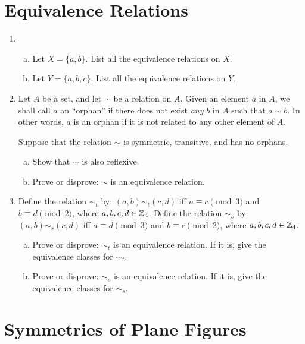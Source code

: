 \section{Equivalence Relations}

\begin{enumerate}

\item
\begin{enumerate}[(a)]
\item
Let $X =\{a, b\}$. List all the equivalence relations on $X$.
\item
Let $Y =\{a, b,c\}$. List all the equivalence relations on $Y$.
\end{enumerate}

\item
Let $A$ be a set, and let $\sim$ be a relation on $A$. Given an element $a$ in  $A$, we shall call $a$ an ``orphan'' if there does not exist \emph{any} $b$ in $A$ such that $a \sim b$. In other words, $a$ is an orphan if it is not related to any other element of $A$.  

Suppose that the relation $\sim$ is symmetric, transitive, and has no orphans.  
\begin{enumerate}[(a)]
\item
Show that $\sim$ is also reflexive.
\item
Prove or disprove:  $\sim$ is an equivalence relation.
\end{enumerate}

\item
Define the relation $\sim_t$ by:  $(a,b) \sim_t  (c,d)$  iff $a \equiv c \pmod{3}$ and $b \equiv d \pmod{2}$, where $a,b,c,d  \in \mathbb{Z}_4$.  Define the relation $\sim_s$  by:  $(a,b) \sim_s (c,d)$ iff $a \equiv d \pmod{3}$ and 
$b \equiv c \pmod{2}$, where $a,b,c,d \in \mathbb{Z}_4$.
\begin{enumerate}[(a)]
\item
Prove or disprove: $\sim_t$ is an equivalence relation. If it is, give the equivalence classes for $\sim_t$.
\item
Prove or disprove: $\sim_s$ is an equivalence relation. If it is, give the equivalence classes for $\sim_s$.
\end{enumerate}


\end{enumerate}

\section{Symmetries of Plane Figures}

